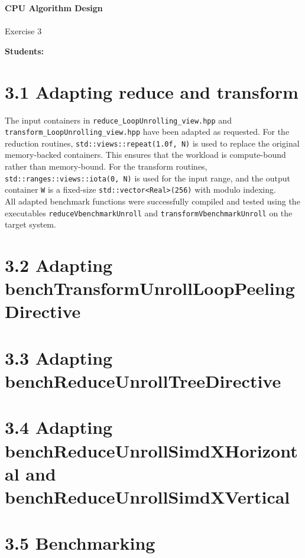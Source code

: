 





\begin{Large}
    \textsf{\textbf{CPU Algorithm Design}} \\
    \\
    Exercise 3
\end{Large}
\vspace{1ex}
\textsf{\textbf{Students:}}  \\
\vspace{2ex}

\section*{3.1 Adapting reduce and transform}

The input containers in \texttt{reduce\_LoopUnrolling\_view.hpp} and \texttt{transform\_LoopUnrolling\_view.hpp} have been adapted as requested.
For the reduction routines, \texttt{std::views::repeat(1.0f, N)} is used to replace the original memory-backed containers. This ensures that the workload is compute-bound rather than memory-bound.
For the transform routines, \texttt{std::ranges::views::iota(0, N)} is used for the input range, and the output container \texttt{W} is a fixed-size \texttt{std::vector<Real>(256)} with modulo indexing.
\\
All adapted benchmark functions were successfully compiled and tested using the executables \texttt{reduceVbenchmarkUnroll} and \texttt{transformVbenchmarkUnroll} on the target system.

\pagebreak

\section*{3.2 Adapting benchTransformUnrollLoopPeelingDirective}

\pagebreak

\section*{3.3 Adapting benchReduceUnrollTreeDirective}

\pagebreak

\section*{3.4 Adapting benchReduceUnrollSimdXHorizontal and benchReduceUnrollSimdXVertical}

\pagebreak

\section*{3.5 Benchmarking}

